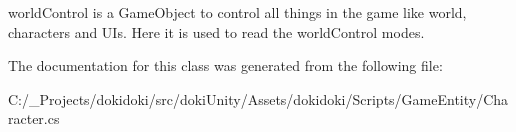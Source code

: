world\+Control is a Game\+Object to control all things in the game like world, characters and U\+Is. Here it is used to read the world\+Control modes. 



The documentation for this class was generated from the following file\+:\begin{DoxyCompactItemize}
\item 
C\+:/\+\_\+\+Projects/dokidoki/src/doki\+Unity/\+Assets/dokidoki/\+Scripts/\+Game\+Entity/Character.\+cs\end{DoxyCompactItemize}
